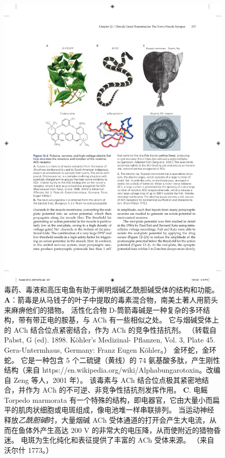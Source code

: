 \begin{figure}[htbp]
	\centering
	\includegraphics[width=0.8\linewidth]{chap12/fig_12_2}
	\caption{毒药、毒液和高压电鱼有助于阐明烟碱乙酰胆碱受体的结构和功能。 
	\textbf{A}：箭毒是从马钱子的叶子中提取的毒素混合物，南美土著人用箭头来麻痹他们的猎物。
	活性化合物 D-筒箭毒碱是一种复杂的多环结构，带有带正电的胺基，与 ACh 有一些相似之处。
	它与烟碱受体上的 ACh 结合位点紧密结合，作为 ACh 的竞争性拮抗剂。 
	（转载自 Pabst, G (ed). 1898. Köhler's Medizinal- Pflanzen, Vol. 3, Plate 45. Gera-Untermhaus, Germany: Franz Eugen Köhler。） 金环蛇，金环蛇。
	它是一种包含 5 个二硫键（黄线）的 74 氨基酸多肽，产生刚性结构（来自 https://en.wikipedia.org/wiki/Alphabungarotoxin。改编自 Zeng 等人，2001 年）。
	该毒素与 ACh 结合位点极其紧密地结合，并作为 ACh 的不可逆、非竞争性拮抗剂发挥作用。
	\textbf{C}. 电鳐 Torpedo marmorata 有一个特殊的结构，即电器官，它由大量小而扁平的肌肉状细胞或电斑组成，像电池堆一样串联排列。
	当运动神经释放\textit{乙酰胆碱}时，大量烟碱 ACh 受体通道的打开会产生大电流，从而在鱼体外产生高达 200 V 的非常大的电压降，从而使附近的猎物昏迷。
	电斑为生化纯化和表征提供了丰富的 ACh 受体来源。 （来自沃尔什 1773。）}
	\label{fig:12_2}
\end{figure}


